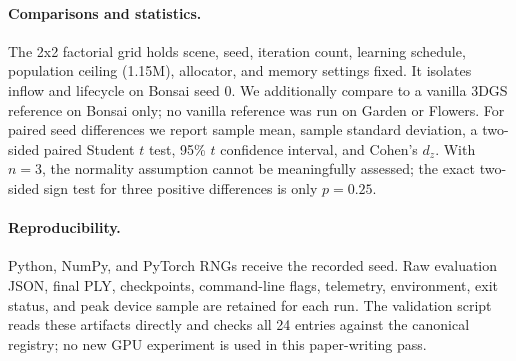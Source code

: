 \paragraph{Comparisons and statistics.}
The 2x2 factorial grid holds scene, seed, iteration count, learning schedule, population ceiling (1.15M), allocator, and memory settings fixed. It isolates inflow and lifecycle on Bonsai seed 0. We additionally compare to a vanilla 3DGS reference on Bonsai only; no vanilla reference was run on Garden or Flowers. For paired seed differences we report sample mean, sample standard deviation, a two-sided paired Student $t$ test, 95\% $t$ confidence interval, and Cohen's $d_z$. With $n=3$, the normality assumption cannot be meaningfully assessed; the exact two-sided sign test for three positive differences is only $p=0.25$.

\paragraph{Reproducibility.}
Python, NumPy, and PyTorch RNGs receive the recorded seed. Raw evaluation JSON, final PLY, checkpoints, command-line flags, telemetry, environment, exit status, and peak device sample are retained for each run. The validation script reads these artifacts directly and checks all 24 entries against the canonical registry; no new GPU experiment is used in this paper-writing pass.
